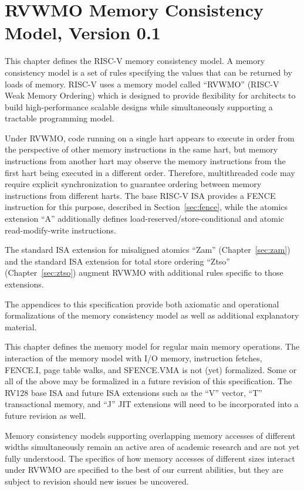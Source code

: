 \chapter{RVWMO Memory Consistency Model, Version 0.1}
\label{ch:memorymodel}

This chapter defines the RISC-V memory consistency model.
A memory consistency model is a set of rules specifying the values that can be returned by loads of memory.
RISC-V uses a memory model called ``RVWMO'' (RISC-V Weak Memory Ordering) which is designed to provide flexibility for architects to build high-performance scalable designs while simultaneously supporting a tractable programming model.

Under RVWMO, code running on a single hart appears to execute in order from the perspective of other memory instructions in the same hart, but memory instructions from another hart may observe the memory instructions from the first hart being executed in a different order.
Therefore, multithreaded code may require explicit synchronization to guarantee ordering between memory instructions from different harts.
The base RISC-V ISA provides a FENCE instruction for this purpose, described in Section~\ref{sec:fence}, while the atomics extension ``A'' additionally defines load-reserved/store-conditional and atomic read-modify-write instructions.

The standard ISA extension for misaligned atomics ``Zam'' (Chapter~\ref{sec:zam}) and the standard ISA extension for total store ordering ``Ztso'' (Chapter~\ref{sec:ztso}) augment RVWMO with additional rules specific to those extensions.

The appendices to this specification provide both axiomatic and operational formalizations of the memory consistency model as well as additional explanatory material.

\begin{commentary}
  This chapter defines the memory model for regular main memory operations.  The interaction of the memory model with I/O memory, instruction fetches, FENCE.I, page table walks, and SFENCE.VMA is not (yet) formalized.  Some or all of the above may be formalized in a future revision of this specification.  The RV128 base ISA and future ISA extensions such as the ``V'' vector, ``T'' transactional memory, and ``J'' JIT extensions will need to be incorporated into a future revision as well.

  Memory consistency models supporting overlapping memory accesses of different widths simultaneously remain an active area of academic research and are not yet fully understood.  The specifics of how memory accesses of different sizes interact under RVWMO are specified to the best of our current abilities, but they are subject to revision should new issues be uncovered.
\end{commentary}

